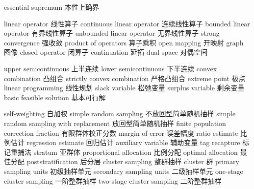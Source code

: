 {essential supremum} 
{本性上确界}

{linear operator} 
{线性算子}
{continuous linear operator} 
{连续线性算子}
{bounded linear operator} 
{有界线性算子}
{unbounded linear operator} 
{无界线性算子}
{strong convergence} 
{强收敛}
{product of operators} 
{算子乘积}
{open mapping} 
{开映射}
{graph} 
{图像}
{closed operator} 
{闭算子}
{continuation} 
{延拓}
{dual space} 
{对偶空间}

{upper semicontinuous} 
{上半连续}
{lower semicontinuous} 
{下半连续}
{convex combination} 
{凸组合}
{strictly convex combination} 
{严格凸组合}
{extreme point} 
{极点}
{linear programming} 
{线性规划}
{slack variable} 
{松弛变量}
{surplus variable} 
{剩余变量}
{basic feasible solution} 
{基本可行解}


{self-weighting} 
{自加权}
{simple random sampling} 
{不放回型简单随机抽样}
{simple random sampling with replacement} 
{放回型简单随机抽样}
{finite population correction fraction} 
{有限群体校正分数}
{margin of error} 
{误差幅度}
{ratio estimate} 
{比例估计}
{regression estimate} 
{回归估计}
{auxiliary variable} 
{辅助变量}
{tag recapture} 
{标记重捕法}
{stratum} 
{亚群体}
{proportional allocation} 
{比例分配}
{optimal allocation} 
{最佳分配}
{poststratification} 
{后分层}
{cluster sampling} 
{整群抽样}
{cluster} 
{群}
{primary sampling units} 
{初级抽样单元}
{secondary sampling units} 
{二级抽样单元}
{one-stage cluster sampling} 
{一阶整群抽样}
{two-stage cluster sampling} 
{二阶整群抽样}

